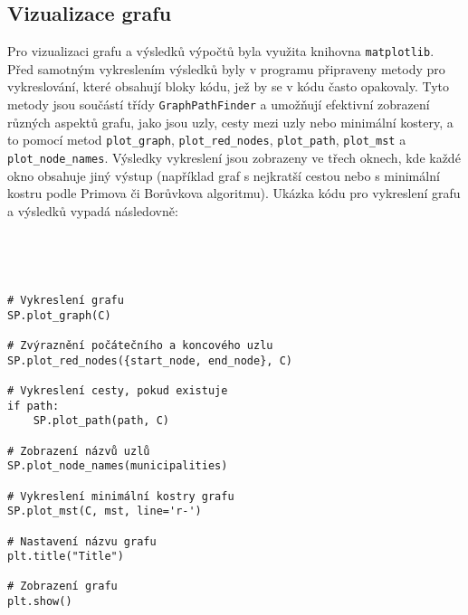 \subsection{Vizualizace grafu}

Pro vizualizaci grafu a výsledků výpočtů byla využita knihovna \texttt{matplotlib}. Před samotným vykreslením výsledků byly v programu připraveny metody pro vykreslování, které obsahují bloky kódu, jež by se v kódu často opakovaly. Tyto metody jsou součástí třídy \texttt{GraphPathFinder} a umožňují efektivní zobrazení různých aspektů grafu, jako jsou uzly, cesty mezi uzly nebo minimální kostery, a to pomocí metod \texttt{plot\_graph}, \texttt{plot\_red\_nodes}, \texttt{plot\_path}, \texttt{plot\_mst} a \texttt{plot\_node\_names}. Výsledky vykreslení jsou zobrazeny ve třech oknech, kde každé okno obsahuje jiný výstup (například graf s nejkratší cestou nebo s minimální kostru podle Primova či Borůvkova algoritmu). Ukázka kódu pro vykreslení grafu a výsledků vypadá následovně:

\begin{verbatim}




# Vykreslení grafu
SP.plot_graph(C)

# Zvýraznění počátečního a koncového uzlu
SP.plot_red_nodes({start_node, end_node}, C)

# Vykreslení cesty, pokud existuje
if path:
    SP.plot_path(path, C)

# Zobrazení názvů uzlů
SP.plot_node_names(municipalities)

# Vykreslení minimální kostry grafu
SP.plot_mst(C, mst, line='r-')

# Nastavení názvu grafu
plt.title("Title")

# Zobrazení grafu
plt.show()
\end{verbatim}